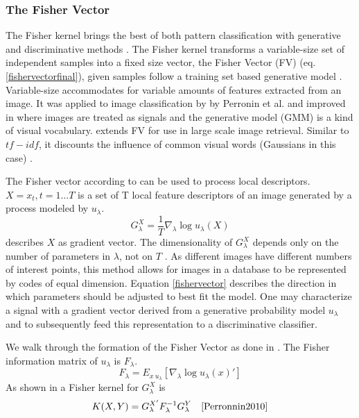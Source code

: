 \documentclass[english,12pt,a4paper,pdftex,elec,utf8, table]{aaltothesis}
\begin{document}
\subsubsection{The Fisher Vector}\label{FV}
The Fisher kernel brings the best of both pattern classification with generative and discriminative methods \cite{Jaakkola1999}. The Fisher kernel transforms a variable-size set of independent samples into a fixed size vector, the Fisher Vector (FV) (eq. \ref{fishervectorfinal}), given samples follow a training set based generative model \cite{Jaakkola1999}. Variable-size accommodates for variable amounts of features extracted from an image. It was applied to image classification by by Perronin et al. \cite{Perronnin2007} and improved in \cite{Perronnin2010} where images are treated as signals and the generative model (GMM) is a kind of visual vocabulary. \cite{Perronnin2010a} extends FV for use in large scale image retrieval. Similar to $tf-idf$, it discounts the influence of common visual words (Gaussians in this case) \cite{Perronnin2010a}.

The Fisher vector according to \cite{Perronnin2010} can be used to process local descriptors. $X = {x_t, t = 1 \ldots T}$ is a set of T local feature descriptors of an image generated by a process modeled by $u_\lambda$.
\begin{equation}\label{fishervector}
 G_\lambda^X = \frac{1}{T}\nabla_\lambda\log u_\lambda(X)
\end{equation}
describes $X$ as gradient vector. The dimensionality of $G_\lambda^X$ depends only on the number of parameters in $\lambda$, not on $T$ \cite{Perronnin2010}. As different images have different numbers of interest points, this method allows for images in a database to be represented by codes of equal dimension. Equation \ref{fishervector} describes the direction in which parameters should be adjusted to best fit the model. One may characterize a signal with a gradient vector derived from a generative probability model $u_\lambda$ and to subsequently feed this representation to a discriminative classifier. \cite{Perronnin2007}

We walk through the formation of the Fisher Vector as done in \cite{Perronnin2010}. The Fisher information matrix of $u_\lambda$ is $F_\lambda$.
\begin{equation}\label{fishermatrix}
F_\lambda = E_{x~u_\lambda}[\nabla_\lambda\log u_\lambda(x)']
\end{equation}
As shown in \cite{Jaakkola1999} a Fisher kernel for $G_\lambda^X$ is
\begin{equation}\label{fisherkernel}
K(X,Y) = G_\lambda^{X'}F_\lambda^{-1}G_\lambda^Y \quad \cite{Perronnin2010}
\end{equation}
\end{document}
